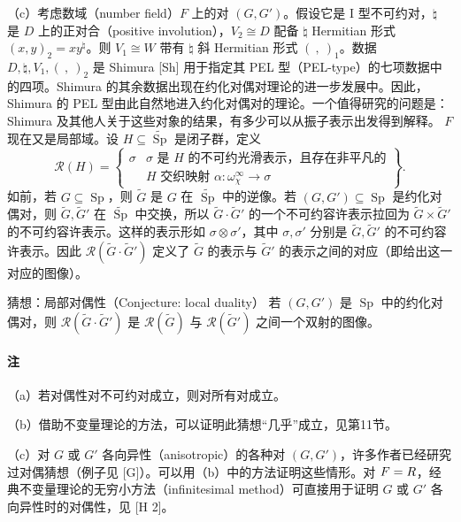 （c）考虑数域（number field）$F$ 上的对 $(G,G')$。假设它是 I 型不可约对，$\natural$ 是 $D$ 上的正对合（positive involution），$V_2\cong D$ 配备 $\natural$ Hermitian 形式 $(x,y)_2=xy^\natural$。则 $V_1\cong W$ 带有 $\natural$ 斜 Hermitian 形式 $(\ ,\ )_1$。数据 $D,\natural,V_1,(\ ,\ )_2$ 是 Shimura [Sh] 用于指定其 PEL 型（PEL-type）的七项数据中的四项。Shimura 的其余数据出现在约化对偶对理论的进一步发展中。因此，Shimura 的 PEL 型由此自然地进入约化对偶对的理论。一个值得研究的问题是：Shimura 及其他人关于这些对象的结果，有多少可以从振子表示出发得到解释。
$F$ 现在又是局部域。设 $H\subseteq\widetilde{\operatorname{Sp}}$ 是闭子群，定义
\[
\mathcal R(H)=\left\{\begin{array}{l|l}
\sigma&\sigma\text{ 是 }H\text{ 的不可约光滑表示，且存在非平凡的}\\
&H\text{ 交织映射 }\alpha:\omega_\chi^\infty\longrightarrow\sigma
\end{array}\right\}.
\]
如前，若 $G\subseteq\operatorname{Sp}$，则 $\widetilde G$ 是 $G$ 在 $\widetilde{\operatorname{Sp}}$ 中的逆像。若 $(G,G')\subseteq\operatorname{Sp}$ 是约化对偶对，则 $\widetilde G,\widetilde G'$ 在 $\widetilde{\operatorname{Sp}}$ 中交换，所以 $\widetilde G\cdot\widetilde G'$ 的一个不可约容许表示拉回为 $\widetilde G\times\widetilde G'$ 的不可约容许表示。这样的表示形如 $\sigma\otimes\sigma'$，其中 $\sigma,\sigma'$ 分别是 $\widetilde G,\widetilde G'$ 的不可约容许表示。因此 $\mathcal R(\widetilde G\cdot\widetilde G')$ 定义了 $\widetilde G$ 的表示与 $\widetilde G'$ 的表示之间的对应（即给出这一对应的图像）。
\begin{originaltheorem}{猜想：局部对偶性（Conjecture: local duality）}
若 $(G,G')$ 是 $\operatorname{Sp}$ 中的约化对偶对，则 $\mathcal R(\widetilde G\cdot\widetilde G')$ 是 $\mathcal R(\widetilde G)$ 与 $\mathcal R(\widetilde G')$ 之间一个双射的图像。
\end{originaltheorem}
\paragraph*{注}
（a）若对偶性对不可约对成立，则对所有对成立。

（b）借助不变量理论的方法，可以证明此猜想“几乎”成立，见第11节。

（c）对 $G$ 或 $G'$ 各向异性（anisotropic）的各种对 $(G,G')$，许多作者已经研究过对偶猜想（例子见 [G]）。可以用（b）中的方法证明这些情形。对 $F=R$，经典不变量理论的无穷小方法（infinitesimal method）可直接用于证明 $G$ 或 $G'$ 各向异性时的对偶性，见 [H 2]。

